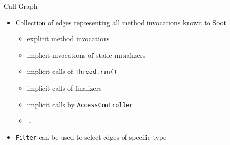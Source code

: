 \newcommand{\comment}[1]{}


\begin{slide}{Call Graph}
\begin{itemize}
\item Collection of edges representing {\red all} method invocations known to Soot
\begin{itemize}
\item explicit method invocations
\item implicit invocations of static initializers
\item implicit calls of {\tt Thread.run()}
\item implicit calls of finalizers
\item implicit calls by {\tt AccessController}
\item \ldots
\end{itemize}
\item {\tt Filter} can be used to select edges of specific type
\end{itemize}
\end{slide}

\comment{
\begin{slide}{Updating Call Graph}
\begin{itemize}
\item {\tt addEdge( Edge )}
\item {\tt removeEdge( Edge )}
\item Call graph queries always give up-to-date information
\end{itemize}
\end{slide}
}


